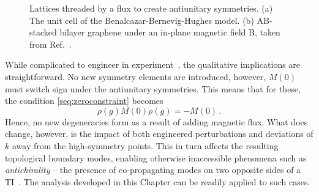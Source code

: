 \begin{figure} [h!]
	\centering
	
	\caption{Lattices threaded by a flux to create antiunitary symmetries. (a) The unit cell of the Benalcazar-Bernevig-Hughes model. (b) AB-stacked bilayer graphene under an in-plane magnetic field B, taken from Ref.~\cite{Denner_2020}.}
	\label{fig:symm_fluxes}
\end{figure}

While complicated to engineer in experiment~\cite{Serra-Garcia_2018}, the qualitative implications are straightforward. No new symmetry elements are introduced, however, $M(0)$ must switch sign under the antiunitary symmetries. This means that for these,  the condition \eqref{seq:zeroconstraint} becomes
\begin{equation}
\rho(g) M(0) \rho(g) = - M(0) \,.
\end{equation} 
Hence, no new degeneracies form as a result of adding magnetic flux. What does change, however, is the impact of both engineered perturbations and deviations of $k$ away from the high-symmetry points. This in turn affects the resulting topological boundary modes, enabling otherwise inaccessible phenomena such as \textit{antichirality} -- the presence of co-propagating modes on two opposite sides of a TI~\cite{Denner_2020}. The analysis developed in this Chapter can be readily applied to such cases. 